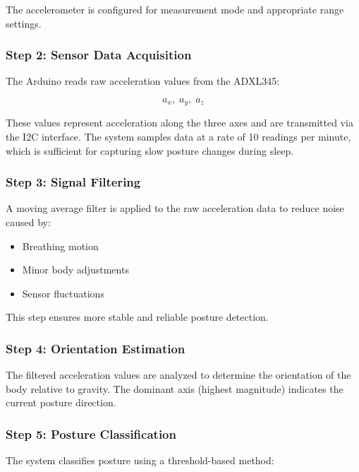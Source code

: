 \documentclass[conference]{IEEEtran}
\begin{document}
The accelerometer is configured for measurement mode and appropriate range settings.

\subsubsection{Step 2: Sensor Data Acquisition}

The Arduino reads raw acceleration values from the ADXL345:

\begin{equation}
a_x,\; a_y,\; a_z
\end{equation}

These values represent acceleration along the three axes and are transmitted via the I2C 
interface. The system samples data at a rate of 10 readings per minute, which is sufficient 
for capturing slow posture changes during sleep.

\subsubsection{Step 3: Signal Filtering}

A moving average filter is applied to the raw acceleration data to reduce noise caused 
by:

\begin{itemize}[leftmargin=*,noitemsep]
    \item Breathing motion
    \item Minor body adjustments
    \item Sensor fluctuations
\end{itemize}

This step ensures more stable and reliable posture detection.

\subsubsection{Step 4: Orientation Estimation}

The filtered acceleration values are analyzed to determine the orientation of the body 
relative to gravity. The dominant axis (highest magnitude) indicates the current posture 
direction.

\subsubsection{Step 5: Posture Classification}

The system classifies posture using a threshold-based method:
\end{document}
